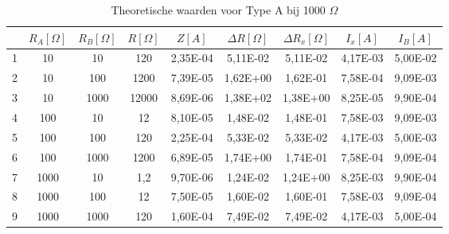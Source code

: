 \begin{table}[H]
    \centering
    \label{tab:TA1OOO}
    \caption{Theoretische waarden voor Type A bij 1000 $\Omega$}
    \begin{tabular}{| c | c | c | c | c | c | c | c | c |}
        \hline
                & $R_A [\Omega]$    & $R_B [\Omega]$    & $R [\Omega]$  & $Z [A]$   & $\Delta R [\Omega]$   & $\Delta R_x [\Omega]$ & $I_x [A]$                 & $I_B [A]$             \\ \hline
                1	&10	&10	&120	&2,35E-04	&5,11E-02	&5,11E-02	&4,17E-03	&5,00E-02           \\ \hline
                2	&10	&100	&1200	&7,39E-05	&1,62E+00	&1,62E-01	&7,58E-04	&9,09E-03\\ \hline
                3	&10	&1000	&12000	&8,69E-06	&1,38E+02	&1,38E+00	&8,25E-05	&9,90E-04\\ \hline
                4	&100	&10	&12	&8,10E-05	&1,48E-02	&1,48E-01	&7,58E-03	&9,09E-03\\ \hline
                5	&100	&100	&120	&2,25E-04	&5,33E-02	&5,33E-02	&4,17E-03	&5,00E-03\\ \hline
                6	&100	&1000	&1200	&6,89E-05	&1,74E+00	&1,74E-01	&7,58E-04	&9,09E-04\\ \hline
                7	&1000	&10	&1,2	&9,70E-06	&1,24E-02	&1,24E+00	&8,25E-03	&9,90E-04\\ \hline
                8	&1000	&100	&12	&7,50E-05	&1,60E-02	&1,60E-01	&7,58E-03	&9,09E-04\\ \hline
                9	&1000	&1000	&120	&1,60E-04	&7,49E-02	&7,49E-02	&4,17E-03	&5,00E-04\\ \hline
    \end{tabular}
\end{table}
